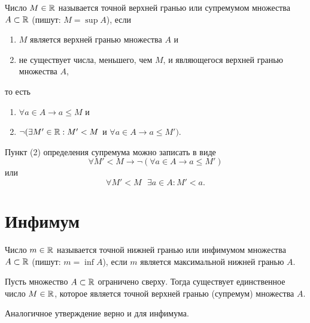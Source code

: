 	\begin{definition}
		Число $M \in \mathbb R$ называется точной верхней гранью или супремумом множества $A \subset \mathbb R$ (пишут: $M = \sup{A}$), если
		\begin{enumerate}
			\item $M$ является верхней гранью множества $A$ и
			\item не существует числа, меньшего, чем $M$, и являющегося верхней гранью множества $A$,
		\end{enumerate}
		то есть
		\begin{enumerate}
			\item $\forall a \in A \rightarrow a \leqslant M$ и
			\item $\neg (\exists M' \in \mathbb R : M' < M$ и $\forall a \in A \rightarrow a \leqslant M').$
		\end{enumerate}
	\end{definition}
	
	\begin{mention}
		Пункт (2) определения супремума можно записать в виде
		\[ \forall M' < M \rightarrow \neg (\forall a \in A \rightarrow a \leqslant M')\]		
		или
		\[ \forall M' < M \text{ } \exists a \in A : M' < a. \]
	\end{mention}
	
	\section{Инфимум}
	
	\begin{definition}
		Число $m \in \mathbb R$ называется точной нижней гранью или инфимумом множества $A \subset \mathbb R$ (пишут: $m = \inf{A}$), если $m$	является максимальной нижней гранью $A$.
	\end{definition}
	
	\begin{theorem}
		Пусть множество $A \subset \mathbb R$ ограничено сверху. Тогда существует
		единственное число $M \in \mathbb R$, которое является точной верхней гранью (супремум) множества $A$.
	\end{theorem}
	
	Аналогичное утверждение верно и для инфимума.
	
